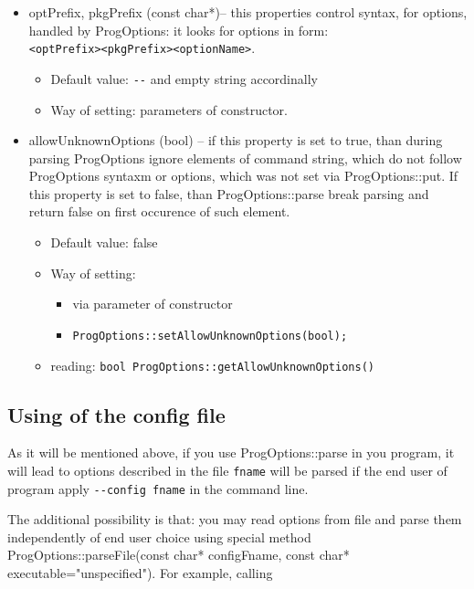 \documentclass[10pt]{article}
\begin{document}
 \begin{itemize}
  \item optPrefix, pkgPrefix (const char*)-- this properties control syntax, for options, handled by ProgOptions: it looks for options in form: \\
    \verb|<optPrefix><pkgPrefix><optionName>|.
   \begin{itemize}
     \item Default value: \verb|--| and empty string accordinally 
     \item Way of setting: parameters of constructor.
   \end{itemize}
  \item allowUnknownOptions (bool) -- if this property is set to true,
  than during parsing ProgOptions ignore elements of command string, which
   do not follow ProgOptions syntaxm or options, which was not set via
   ProgOptions::put. If this property is set to false, than ProgOptions::parse
   break parsing and return false on first occurence of such element.
   \begin{itemize}
     \item Default value: false
     \item Way of setting: 
     \begin{itemize}
       \item via parameter of constructor 
       \item \verb|ProgOptions::setAllowUnknownOptions(bool);|
     \end{itemize}
     \item reading: \verb|bool ProgOptions::getAllowUnknownOptions()|
   \end{itemize}
 \end{itemize}



\label{Additional resources}

\subsection{ Using of the config file }

  As it will be mentioned above, if you use ProgOptions::parse in you program,
it will lead to options described in the file \verb|fname| will be parsed
if the end user of program apply \verb|--config fname| in the command line.

  The additional possibility is that:  you may read options from file and parse them
independently of end user choice using special method
ProgOptions::parseFile(const char* configFname, const char* executable="unspecified").
For example, calling
\end{document}

